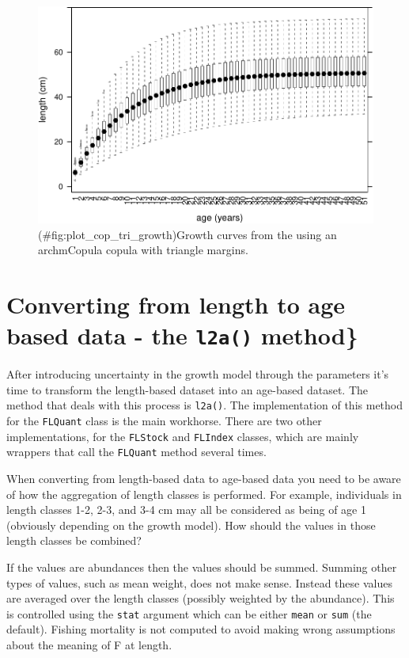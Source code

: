 \documentclass[
]{book}
\begin{document}
\begin{figure}
\centering
\includegraphics{_main_files/figure-latex/plot_cop_tri_growth-1.pdf}
\caption{(\#fig:plot\_cop\_tri\_growth)Growth curves from the using an archmCopula copula with triangle margins.}
\end{figure}

\hypertarget{converting-from-length-to-age-based-data---the-l2a-method}{%
\section{\texorpdfstring{Converting from length to age based data - the \texttt{l2a()} method\}}{Converting from length to age based data - the l2a() method\}}}\label{converting-from-length-to-age-based-data---the-l2a-method}}

After introducing uncertainty in the growth model through the parameters it's time to transform the length-based dataset into an age-based dataset. The method that deals with this process is \texttt{l2a()}. The implementation of this method for the \texttt{FLQuant} class is the main workhorse. There are two other implementations, for the \texttt{FLStock} and \texttt{FLIndex} classes, which are mainly wrappers that call the \texttt{FLQuant} method several times.

When converting from length-based data to age-based data you need to be aware of how the aggregation of length classes is performed. For example, individuals in length classes 1-2, 2-3, and 3-4 cm may all be considered as being of age 1 (obviously depending on the growth model). How should the values in those length classes be combined?

If the values are abundances then the values should be summed. Summing other types of values, such as mean weight, does not make sense. Instead these values are averaged over the length classes (possibly weighted by the abundance). This is controlled using the \texttt{stat} argument which can be either \texttt{mean} or \texttt{sum} (the default). Fishing mortality is not computed to avoid making wrong assumptions about the meaning of F at length.
\end{document}

